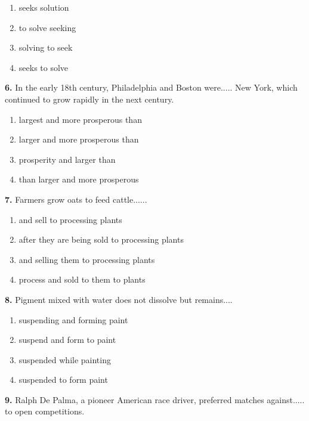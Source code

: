 \documentclass[12pt]{article}
\begin{document}
\begin{enumerate}[label=(\Alph*),leftmargin=*,itemsep=0.2em]
\item seeks solution
\item to solve seeking
\item solving to seek
\item seeks to solve
\end{enumerate}
\par
\vspace{0.25\baselineskip}
\noindent\textbf{6.} In the early 18th century, Philadelphia and Boston were..... New York, which continued to grow rapidly in the next century.
\begin{enumerate}[label=(\Alph*),leftmargin=*,itemsep=0.2em]
\item largest and more prosperous than
\item larger and more prosperous than
\item prosperity and larger than
\item than larger and more prosperous
\end{enumerate}
\par
\vspace{0.25\baselineskip}
\noindent\textbf{7.} Farmers grow oats to feed cattle......
\begin{enumerate}[label=(\Alph*),leftmargin=*,itemsep=0.2em]
\item and sell to processing plants
\item after they are being sold to processing plants
\item and selling them to processing plants
\item process and sold to them to plants
\end{enumerate}
\par
\vspace{0.25\baselineskip}
\noindent\textbf{8.} Pigment mixed with water does not dissolve but remains....
\begin{enumerate}[label=(\Alph*),leftmargin=*,itemsep=0.2em]
\item suspending and forming paint
\item suspend and form to paint
\item suspended while painting
\item suspended to form paint
\end{enumerate}
\par
\vspace{0.25\baselineskip}
\noindent\textbf{9.} Ralph De Palma, a pioneer American race driver, preferred matches against..... to open competitions.
\end{document}
